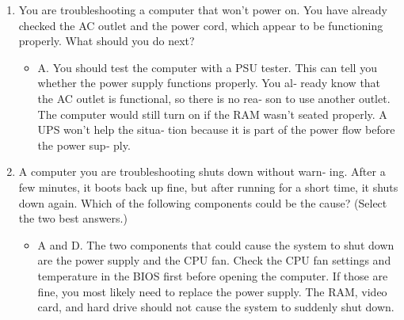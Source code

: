 \documentclass{article}
\begin{document}
\begin{enumerate}
    \item You are troubleshooting a computer that won’t power on. You
have already checked the AC outlet and the power cord, which
appear to be functioning properly. What should you do next?
    \begin{itemize}
        \item A. You should test the computer with a PSU tester. This can
tell you whether the power supply functions properly. You al‐
ready know that the AC outlet is functional, so there is no rea‐
son to use another outlet. The computer would still turn on if
the RAM wasn’t seated properly. A UPS won’t help the situa‐
tion because it is part of the power flow before the power sup‐
ply.
    \end{itemize}
    \item A computer you are troubleshooting shuts down without warn‐
ing. After a few minutes, it boots back up fine, but after running
for a short time, it shuts down again. Which of the following
components could be the cause? (Select the two best answers.)
    \begin{itemize}
        \item A and D. The two components that could cause the system to
shut down are the power supply and the CPU fan. Check the
CPU fan settings and temperature in the BIOS first before
opening the computer. If those are fine, you most likely need
to replace the power supply. The RAM, video card, and hard
drive should not cause the system to suddenly shut down.
    \end{itemize}
    
\end{enumerate}
\end{document}

